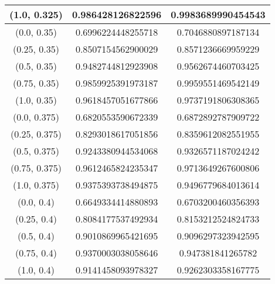 \begin{table}[H]
\begin{tabular}{|c|c|c|}
\hline
(1.0, 0.325) & 0.986428126822596 & 0.9983689990454543 \\
\hline
\hline
(0.0, 0.35) & 0.6996224448255718 & 0.7046880897187134 \\
\hline
(0.25, 0.35) & 0.8507154562900029 & 0.8571236669959229 \\
\hline
(0.5, 0.35) & 0.9482744812923908 & 0.9562674460703425 \\
\hline
(0.75, 0.35) & 0.9859925391973187 & 0.9959551469542149 \\
\hline
(1.0, 0.35) & 0.9618457051677866 & 0.9737191806308365 \\
\hline
\hline
(0.0, 0.375) & 0.6820553590672339 & 0.6872892787909722 \\
\hline
(0.25, 0.375) & 0.8293018617051856 & 0.8359612082551955 \\
\hline
(0.5, 0.375) & 0.9243380944534068 & 0.9326571187024242 \\
\hline
(0.75, 0.375) & 0.9612465824235347 & 0.9713649267600806 \\
\hline
(1.0, 0.375) & 0.9375393738494875 & 0.9496779684013614 \\
\hline
\hline
(0.0, 0.4) & 0.6649334414880893 & 0.6703200460356393 \\
\hline
(0.25, 0.4) & 0.8084177537492934 & 0.8153212524824733 \\
\hline
(0.5, 0.4) & 0.9010869965421695 & 0.9096297323942595 \\
\hline
(0.75, 0.4) & 0.9370003038058646 & 0.947381841265782 \\
\hline
(1.0, 0.4) & 0.9141458093978327 & 0.9262303358167775 \\
\hline
\end{tabular}
\end{table}

